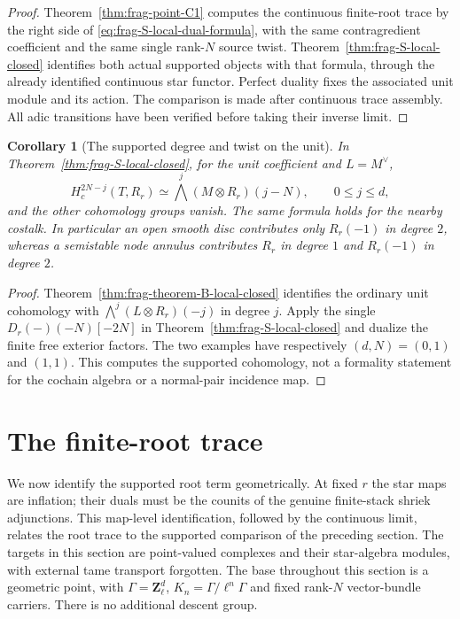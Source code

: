 \documentclass[11pt]{article}
\newtheorem{corollary}[theorem]{Corollary}
\theoremstyle{definition}
\theoremstyle{remark}
\begin{document}
\begin{proof}
Theorem~\ref{thm:frag-point-C1} computes the continuous finite-root trace by the
right side of \eqref{eq:frag-S-local-dual-formula}, with the same
contragredient coefficient and the same single rank-$N$ source twist.
Theorem~\ref{thm:frag-S-local-closed} identifies both actual supported objects with that
formula, through the already identified continuous star functor.
Perfect duality fixes the associated unit module and its action.
The comparison is made after continuous trace assembly.  All adic
transitions have been verified before taking their inverse limit.
\end{proof}

\begin{corollary}[The supported degree and twist on the unit]
\label{cor:frag-S-unit-degrees}
In Theorem~\ref{thm:frag-S-local-closed}, for the unit coefficient and $L=M^\vee$,
\[
 H_c^{2N-j}(T,R_r)
 \simeq \bigwedge^j(M\otimes R_r)(j-N),\qquad 0\le j\le d,
\]
and the other cohomology groups vanish.  The same formula holds for
the nearby costalk.  In particular an open smooth disc contributes
only $R_r(-1)$ in degree $2$, whereas a semistable node annulus
contributes $R_r$ in degree $1$ and $R_r(-1)$ in degree $2$.
\end{corollary}

\begin{proof}
Theorem~\ref{thm:frag-theorem-B-local-closed} identifies the ordinary unit cohomology with
$\bigwedge^j(L\otimes R_r)(-j)$ in degree $j$.  Apply the single
$D_r(-)(-N)[-2N]$ in Theorem~\ref{thm:frag-S-local-closed} and dualize the finite free
exterior factors.  The two examples have respectively $(d,N)=(0,1)$
and $(1,1)$.  This computes the supported cohomology, not a formality
statement for the cochain algebra or a normal-pair incidence map.
\end{proof}


\section{The finite-root trace}
\label{sec:local-finite-root-trace}
\label{sec:frag-point-core}

We now identify the supported root term geometrically.  At fixed
$r$ the star maps are inflation; their duals must be the counits
of the genuine finite-stack shriek adjunctions.  This map-level
identification, followed by the continuous limit, relates the
root trace to the supported comparison of the preceding section.
The targets in this section are point-valued complexes and their
star-algebra modules, with external tame transport forgotten.
The base throughout this section is a geometric point, with
$\Gamma=\mathbf Z_\ell^d$, $K_n=\Gamma/\ell^n\Gamma$ and fixed
rank-$N$ vector-bundle carriers.  There is no additional descent group.
\end{document}
